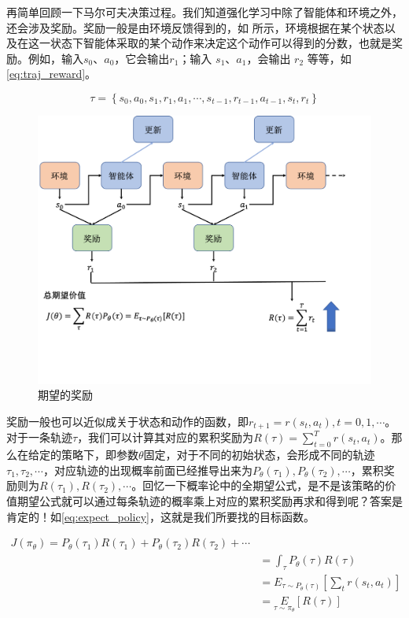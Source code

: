 再简单回顾一下马尔可夫决策过程。我们知道强化学习中除了智能体和环境之外，还会涉及奖励。奖励一般是由环境反馈得到的，如 所示，环境根据在某个状态以及在这一状态下智能体采取的某个动作来决定这个动作可以得到的分数，也就是奖励。例如，输入$s_0$、$a_0$，它会输出$r_1$；输入 $s_1$、$a_1$，会输出 $r_2$ 等等，如\eqref{eq:traj_reward}。

\begin{equation}
    \label{eq:traj_reward}
    \tau=\left\{s_{0}, a_{0}, s_{1},r_{1},a_{1},\cdots, s_{t-1}, r_{t-1}, a_{t-1},s_{t},r_{t}\right\}
\end{equation}

\begin{figure}[hbt]
    \centering
    \includegraphics[width=0.5\linewidth]{ch6/figs/expected_reward.png}
    \caption{期望的奖励}
    \label{fig:expected_reward}
\end{figure}

奖励一般也可以近似成关于状态和动作的函数，即$r_{t+1}=r(s_t,a_t),t=0,1,\cdots$。对于一条轨迹$\tau$，我们可以计算其对应的累积奖励为$R(\tau)=\sum_{t=0}^T r\left(s_t, a_t\right)$。那么在给定的策略下，即参数$\theta$固定，对于不同的初始状态，会形成不同的轨迹$\tau_{1},\tau_{2},\cdots$，对应轨迹的出现概率前面已经推导出来为$P_{\theta}(\tau_{1}),P_{\theta}(\tau_{2}),\cdots$，累积奖励则为$R(\tau_{1}),R(\tau_{2}),\cdots$。回忆一下概率论中的全期望公式，是不是该策略的价值期望公式就可以通过每条轨迹的概率乘上对应的累积奖励再求和得到呢？答案是肯定的！如\eqref{eq:expect_policy}，这就是我们所要找的目标函数。

\begin{equation}
    \label{eq:expect_policy}
    \begin{aligned}
    J(\pi_{\theta}) = P_{\theta}(\tau_{1})R(\tau_{1})+P_{\theta}(\tau_{2})R(\tau_{2})+\cdots \\
    &=\int_\tau P_{\theta}(\tau) R(\tau) \\ 
    &=E_{\tau \sim P_\theta(\tau)}[\sum_t r(s_t, a_t)] \\
    &=\underset{\tau \sim \pi_\theta}{E}[R(\tau)] 
    \end{aligned}
\end{equation}

